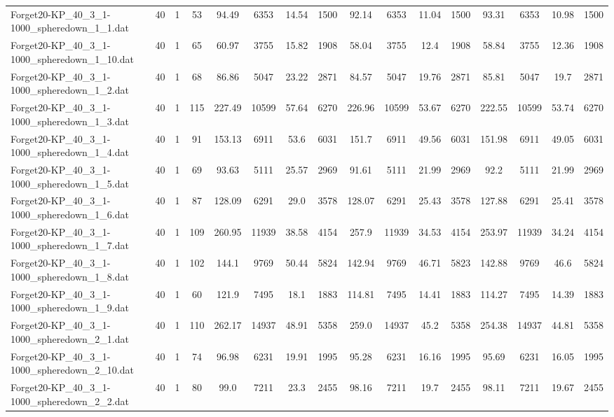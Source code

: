 \begin{sidewaystable}[!ht]
{\begin{tabular}{lccccccccccccccc}
Forget20-KP\_40\_3\_1-1000\_spheredown\_1\_1.dat & 40 & 1 & 53 & 94.49 & 6353 & 14.54 & 1500 & 92.14 & 6353 & 11.04 & 1500 & 93.31 & 6353 & 10.98 & 1500 \\
Forget20-KP\_40\_3\_1-1000\_spheredown\_1\_10.dat & 40 & 1 & 65 & 60.97 & 3755 & 15.82 & 1908 & 58.04 & 3755 & 12.4 & 1908 & 58.84 & 3755 & 12.36 & 1908 \\
Forget20-KP\_40\_3\_1-1000\_spheredown\_1\_2.dat & 40 & 1 & 68 & 86.86 & 5047 & 23.22 & 2871 & 84.57 & 5047 & 19.76 & 2871 & 85.81 & 5047 & 19.7 & 2871 \\
Forget20-KP\_40\_3\_1-1000\_spheredown\_1\_3.dat & 40 & 1 & 115 & 227.49 & 10599 & 57.64 & 6270 & 226.96 & 10599 &  \textcolor{blue2}{53.67} & 6270 & 222.55 & 10599 & 53.74 & 6270 \\
Forget20-KP\_40\_3\_1-1000\_spheredown\_1\_4.dat & 40 & 1 & 91 & 153.13 & 6911 & 53.6 & 6031 & 151.7 & 6911 & 49.56 & 6031 & 151.98 & 6911 & 49.05 & 6031 \\
Forget20-KP\_40\_3\_1-1000\_spheredown\_1\_5.dat & 40 & 1 & 69 & 93.63 & 5111 & 25.57 & 2969 & 91.61 & 5111 & 21.99 & 2969 & 92.2 & 5111 & 21.99 & 2969 \\
Forget20-KP\_40\_3\_1-1000\_spheredown\_1\_6.dat & 40 & 1 & 87 & 128.09 & 6291 & 29.0 & 3578 & 128.07 & 6291 & 25.43 & 3578 & 127.88 & 6291 &  \textcolor{blue2}{25.41} & 3578 \\
Forget20-KP\_40\_3\_1-1000\_spheredown\_1\_7.dat & 40 & 1 & 109 & 260.95 & 11939 & 38.58 & 4154 & 257.9 & 11939 & 34.53 & 4154 & 253.97 & 11939 & 34.24 & 4154 \\
Forget20-KP\_40\_3\_1-1000\_spheredown\_1\_8.dat & 40 & 1 & 102 & 144.1 & 9769 & 50.44 & 5824 & 142.94 & 9769 & 46.71 & 5823 & 142.88 & 9769 &  \textcolor{blue2}{46.6} & 5824 \\
Forget20-KP\_40\_3\_1-1000\_spheredown\_1\_9.dat & 40 & 1 & 60 & 121.9 & 7495 & 18.1 & 1883 & 114.81 & 7495 & 14.41 & 1883 & 114.27 & 7495 &  \textcolor{blue2}{14.39} & 1883 \\
Forget20-KP\_40\_3\_1-1000\_spheredown\_2\_1.dat & 40 & 1 & 110 & 262.17 & 14937 & 48.91 & 5358 & 259.0 & 14937 & 45.2 & 5358 & 254.38 & 14937 &  \textcolor{blue2}{44.81} & 5358 \\
Forget20-KP\_40\_3\_1-1000\_spheredown\_2\_10.dat & 40 & 1 & 74 & 96.98 & 6231 & 19.91 & 1995 & 95.28 & 6231 & 16.16 & 1995 & 95.69 & 6231 & 16.05 & 1995 \\
Forget20-KP\_40\_3\_1-1000\_spheredown\_2\_2.dat & 40 & 1 & 80 & 99.0 & 7211 & 23.3 & 2455 & 98.16 & 7211 & 19.7 & 2455 & 98.11 & 7211 & 19.67 & 2455 \\

\end{tabular}}
\end{sidewaystable}
